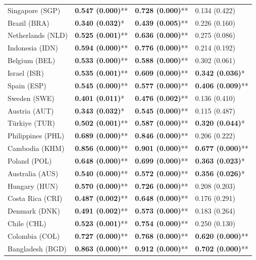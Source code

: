 \begin{longtable}{p{4cm}p{3cm}p{3cm}p{3cm}}
Singapore (SGP) & \textbf{0.547 (0.000)}** & \textbf{0.728 (0.000)}** & 0.134 (0.422) \\
Brazil (BRA) & \textbf{0.340 (0.032)}* & \textbf{0.439 (0.005)}** & 0.226 (0.160) \\
Netherlands (NLD) & \textbf{0.525 (0.001)}** & \textbf{0.636 (0.000)}** & 0.275 (0.086) \\
Indonesia (IDN) & \textbf{0.594 (0.000)}** & \textbf{0.776 (0.000)}** & 0.214 (0.192) \\
Belgium (BEL) & \textbf{0.533 (0.000)}** & \textbf{0.588 (0.000)}** & 0.302 (0.061) \\
Israel (ISR) & \textbf{0.535 (0.001)}** & \textbf{0.609 (0.000)}** & \textbf{0.342 (0.036)}* \\
Spain (ESP) & \textbf{0.545 (0.000)}** & \textbf{0.577 (0.000)}** & \textbf{0.406 (0.009)}** \\
Sweden (SWE) & \textbf{0.401 (0.011)}* & \textbf{0.476 (0.002)}** & 0.136 (0.410) \\
Austria (AUT) & \textbf{0.343 (0.032)}* & \textbf{0.545 (0.000)}** & 0.115 (0.487) \\
Türkiye (TUR) & \textbf{0.502 (0.001)}** & \textbf{0.587 (0.000)}** & \textbf{0.320 (0.044)}* \\
Philippines (PHL) & \textbf{0.689 (0.000)}** & \textbf{0.846 (0.000)}** & 0.206 (0.222) \\
Cambodia (KHM) & \textbf{0.856 (0.000)}** & \textbf{0.901 (0.000)}** & \textbf{0.677 (0.000)}** \\
Poland (POL) & \textbf{0.648 (0.000)}** & \textbf{0.699 (0.000)}** & \textbf{0.363 (0.023)}* \\
Australia (AUS) & \textbf{0.540 (0.000)}** & \textbf{0.572 (0.000)}** & \textbf{0.356 (0.026)}* \\
Hungary (HUN) & \textbf{0.570 (0.000)}** & \textbf{0.726 (0.000)}** & 0.208 (0.203) \\
Costa Rica (CRI) & \textbf{0.487 (0.002)}** & \textbf{0.648 (0.000)}** & 0.176 (0.291) \\
Denmark (DNK) & \textbf{0.491 (0.002)}** & \textbf{0.573 (0.000)}** & 0.183 (0.264) \\
Chile (CHL) & \textbf{0.523 (0.001)}** & \textbf{0.754 (0.000)}** & 0.250 (0.130) \\
Colombia (COL) & \textbf{0.727 (0.000)}** & \textbf{0.768 (0.000)}** & \textbf{0.620 (0.000)}** \\
Bangladesh (BGD) & \textbf{0.863 (0.000)}** & \textbf{0.912 (0.000)}** & \textbf{0.702 (0.000)}** \\

\end{longtable}
